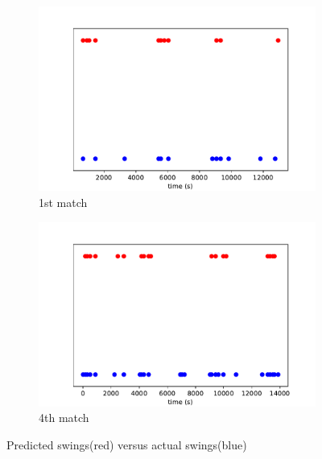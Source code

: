 \documentclass[UTF8]{mcmthesis}
\begin{document}
	
	\begin{figure}[H]
		\centering
		
		\begin{subfigure}[b]{\textwidth}
			\includegraphics[width=1\linewidth]{figs/fig7_0.pdf}
			\caption{1st match}
			\label{fig:topfig7_0}
		\end{subfigure}
		
		\vspace{1cm}
		
		\begin{subfigure}[b]{\textwidth}
			\includegraphics[width=1\linewidth]{figs/fig7_3.pdf}
			\caption{4th match}
			\label{fig:bottom}
		\end{subfigure}
		
		\caption{Predicted swings(red) versus actual swings(blue)}
		\label{fig:both_figures}
	\end{figure}
	
\end{document}

